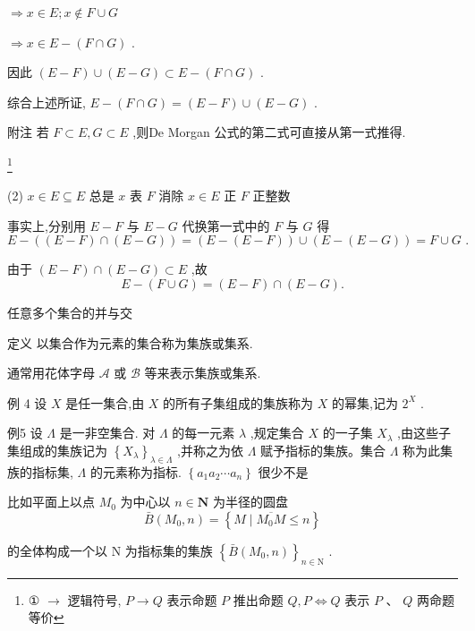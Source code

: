$\Rightarrow  x \in  E;x \notin  F \cup  G$

$\Rightarrow  x \in  E - \left( {F \cap  G}\right)$ .

因此 $\left( {E - F}\right)  \cup  \left( {E - G}\right)  \subset  E - \left( {F \cap  G}\right)$ .

综合上述所证, $E - \left( {F \cap  G}\right)  = \left( {E - F}\right)  \cup  \left( {E - G}\right)$ .

附注 若 $F \subset  E,G \subset  E$ ,则De Morgan 公式的第二式可直接从第一式推得.

\footnote{
	
	① $\rightarrow$ 逻辑符号, $P \rightarrow  Q$ 表示命题 $P$ 推出命题 $Q,P \Leftrightarrow  Q$ 表示 $P\text{ 、 }Q$ 两命题等价
	
}

(2) $x \in  E \subseteq  E$ 总是 $x$ 表 $F$ 消除 $x \in  E$ 正 $F$ 正整数

事实上,分别用 $E - F$ 与 $E - G$ 代换第一式中的 $F$ 与 $G$ 得
$$E - \left( {\left( {E - F}\right)  \cap  \left( {E - G}\right) }\right)  = \left( {E - \left( {E - F}\right) }\right)  \cup  \left( {E - \left( {E - G}\right) }\right)
= F \cup  G\text{ . }$$

由于 $\left( {E - F}\right)  \cap  \left( {E - G}\right)  \subset  E$ ,故
$$E - \left( {F \cup  G}\right)  = \left( {E - F}\right)  \cap  \left( {E - G}\right) .$$

任意多个集合的并与交

定义 以集合作为元素的集合称为集族或集系.

通常用花体字母 $\mathcal{A}$ 或 $\mathcal{B}$ 等来表示集族或集系.

例 4 设 $X$ 是任一集合,由 $X$ 的所有子集组成的集族称为 $X$ 的幂集,记为 ${2}^{X}$ .

例5 设 $\Lambda$ 是一非空集合. 对 $\Lambda$ 的每一元素 $\lambda$ ,规定集合 $X$ 的一子集 ${X}_{\lambda }$ ,由这些子集组成的集族记为 ${\left\{  {X}_{\lambda }\right\}  }_{\lambda  \in  \Lambda }$ ,并称之为依 $\Lambda$ 赋予指标的集族。集合 $\Lambda$ 称为此集族的指标集, $\Lambda$ 的元素称为指标. $\left\{  {{a}_{1}{a}_{2}\cdots {a}_{n}}\right\}$ 很少不是

比如平面上以点 ${M}_{0}$ 为中心以 $n \in  \mathbf{N}$ 为半径的圆盘
$$\bar{B}\left( {{M}_{0},n}\right)  = \left\{  {M \mid  \overline{{M}_{0}M} \leq  n}\right\}$$

的全体构成一个以 $\mathrm{N}$ 为指标集的集族 ${\left\{  \bar{B}\left( {M}_{0},n\right) \right\}  }_{n \in  \mathrm{N}}$ .

